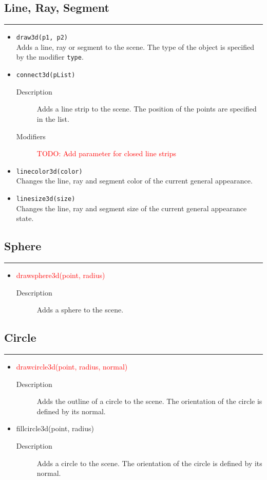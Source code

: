 \documentclass[10pt,a4widepaper]{scrartcl}
\newcommand{\csubsection}[1]{\subsection*{#1}\vspace{-0.55cm}\textcolor{CBlue}{\rule[1ex]{\textwidth}{0.4pt}}}
\begin{document}
\csubsection{Line, Ray, Segment}
\begin{itemize}



\item \textcolor{CBlue}{\texttt{draw3d(p1, p2)}}\\[1ex]
Adds a line, ray or segment to the scene. The type of the object is specified by the modifier \texttt{type}.

\item \textcolor{CBlue}{\texttt{connect3d(pList)}}
\begin{description}
\item[Description] Adds a line strip to the scene. The position of the points are specified in the list.
\item[Modifiers] \textcolor{red}{TODO: Add parameter for closed line strips}
\end{description}

\item \textcolor{CBlue}{\texttt{linecolor3d(color)}}\\[1ex]
Changes the line, ray and segment color of the current general appearance.

\item \textcolor{CBlue}{\texttt{linesize3d(size)}}\\[1ex]
Changes the line, ray and segment size of the current general appearance state.

\end{itemize}
\csubsection{Sphere}
\begin{itemize}
\item \textcolor{red}{drawsphere3d(point, radius)}
\begin{description}
\item[Description] Adds a sphere to the scene.
\end{description}
\end{itemize}

\csubsection{Circle}
\begin{itemize}
\item \textcolor{red}{drawcircle3d(point, radius, normal)}
\begin{description}
\item[Description] Adds the outline of a circle to the scene. The orientation of the circle is defined by its normal.
\end{description}

\item \textcolor{CBlue}{fillcircle3d(point, radius)}
\begin{description}
\item[Description] Adds a circle to the scene. The orientation of the circle is defined by its normal.
\end{description}
\end{itemize}
\end{document}
